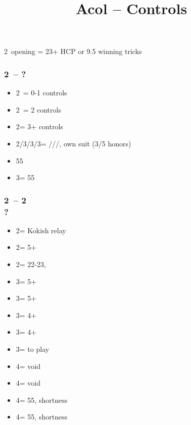 \documentclass[12pt, a4paper]{article}
\title{Acol -- Controls}
\author{}
\begin{document}
\maketitle


2\clubs\ opening = 23+ HCP or 9.5 winning tricks

\subsubsection*{2\clubs\ -- ?}
\begin{itemize}
    \item 2\diams\ = 0-1 controls
    \item 2\hearts\ = 2 controls
    \item 2\spades = 3+ controls
    \item 2\nt/3\clubs/3\diams/3\hearts = \clubs/\diamonds/\hearts/\spades, own suit (3/5 honors)
    \item 55\minor
    \item 3\nt = 55\major
\end{itemize}

\subsubsection*{2\clubs\ -- 2\diams\\?}
\begin{itemize}
    \item 2\hearts = Kokish relay
    \item 2\spades = 5+\spades
    \item 2\nt = 22-23, \bal
    \item 3\clubs = 5+\clubs
    \item 3\diams = 5+\diams
    \item 3\hearts = 4+\diams
    \item 3\spades = 4+\diams
    \item 3\nt = to play
    \item 4\clubs = \hearts void
    \item 4\diams = \spades void
    \item 4\hearts = 55\minor, \hearts shortness
    \item 4\spades = 55\minor, \spades shortness
\end{itemize}
\end{document}
